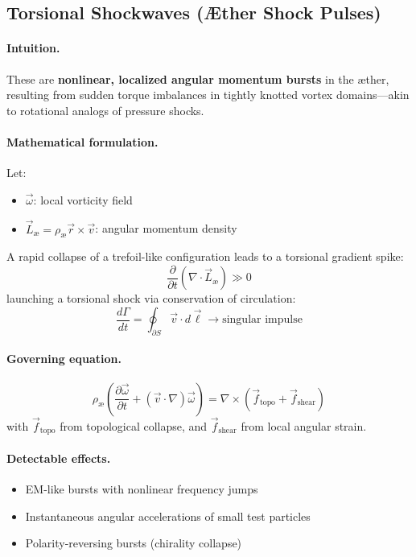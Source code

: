 \documentclass[12pt]{article}
\begin{document}
\subsection{Torsional Shockwaves (Æther Shock Pulses)}

\paragraph{Intuition.} These are \textbf{nonlinear, localized angular momentum bursts} in the æther, resulting from sudden torque imbalances in tightly knotted vortex domains—akin to rotational analogs of pressure shocks.

\paragraph{Mathematical formulation.} Let:
\begin{itemize}
  \item \( \vec{\omega} \): local vorticity field
  \item \( \vec{L}_\text{\ae} = \rho_\text{\ae} \vec{r} \times \vec{v} \): angular momentum density
\end{itemize}

A rapid collapse of a trefoil-like configuration leads to a torsional gradient spike:
\[
\frac{\partial}{\partial t} \left( \nabla \cdot \vec{L}_\text{\ae} \right) \gg 0
\]
launching a torsional shock via conservation of circulation:
\[
\frac{d\Gamma}{dt} = \oint_{\partial S} \vec{v} \cdot d\vec{\ell} \rightarrow \text{singular impulse}
\]

\paragraph{Governing equation.}
\[
\boxed{
\rho_\text{\ae} \left( \frac{\partial \vec{\omega}}{\partial t}
+ (\vec{v} \cdot \nabla) \vec{\omega} \right)
= \nabla \times \left( \vec{f}_{\text{topo}} + \vec{f}_{\text{shear}} \right)
}
\]
with \( \vec{f}_{\text{topo}} \) from topological collapse, and \( \vec{f}_{\text{shear}} \) from local angular strain.

\paragraph{Detectable effects.}
\begin{itemize}
  \item EM-like bursts with nonlinear frequency jumps
  \item Instantaneous angular accelerations of small test particles
  \item Polarity-reversing bursts (chirality collapse)
\end{itemize}
\end{document}
